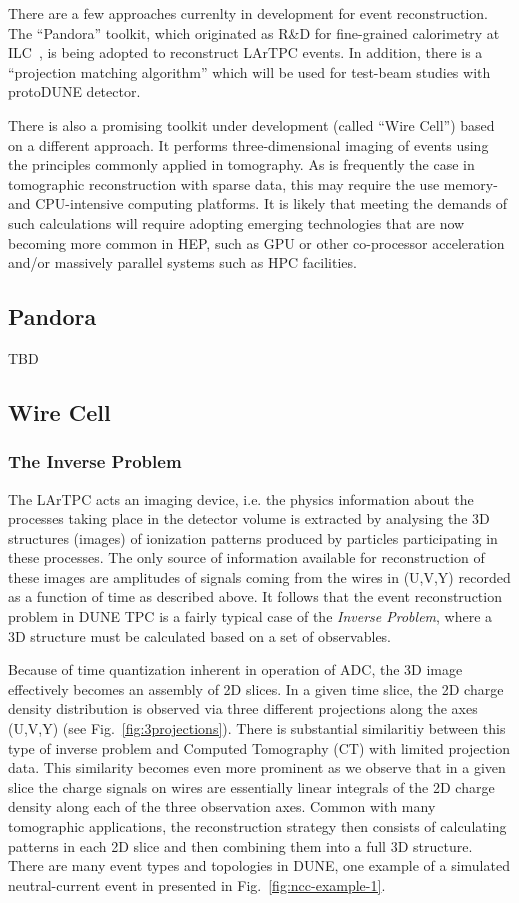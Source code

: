 There are a few approaches currenlty in development for event reconstruction. The ``Pandora'' toolkit, which
originated as R\&D for fine-grained calorimetry at ILC~\cite{pandora}, is being adopted to reconstruct LArTPC events.
In addition, there is a ``projection matching algorithm'' which will be used for test-beam studies with protoDUNE detector.

There is also a promising toolkit under development (called ``Wire Cell'') based on a different approach.
It performs three-dimensional imaging of events using the principles commonly applied in tomography.
As is frequently the case in tomographic reconstruction with sparse data, this may require the use memory- and CPU-intensive computing platforms.
It is likely that meeting the demands of such calculations will require adopting emerging technologies that are now becoming more common in
HEP, such as GPU or other co-processor acceleration and/or massively parallel systems such as HPC facilities.

\subsection{Pandora}
TBD


\subsection{Wire Cell}
\label{sec:wirecell}
\subsubsection{The Inverse Problem}

The LArTPC acts an imaging device, i.e. the physics information about the processes taking place in the detector volume is extracted by
analysing the 3D structures (images) of ionization patterns produced by particles participating in these processes. The only source of information
available for reconstruction of these images are amplitudes of signals coming from the wires in (U,V,Y) recorded as a function of time
as described above. It follows that the event reconstruction problem in DUNE TPC is a fairly typical case of the \textit{Inverse Problem},
where a 3D structure must be calculated based on a set of observables.

Because of time quantization inherent in operation of ADC, the 3D image effectively becomes an assembly of 2D slices.
In a given time slice, the 2D charge density distribution is observed via three different projections along the axes (U,V,Y) (see Fig.~\ref{fig:3projections}).
There is substantial similaritiy between this type of inverse problem and Computed Tomography (CT) with limited projection data. This similarity becomes even more prominent as we observe that in a
given slice the charge signals on wires are essentially linear integrals of the 2D charge density along each of the three observation axes. Common with many tomographic applications, the reconstruction strategy
then consists of calculating patterns in each 2D slice and then combining them into a full 3D structure. There are many event types and topologies
in DUNE, one example of a simulated neutral-current event in presented in Fig.~\ref{fig:ncc-example-1}.

